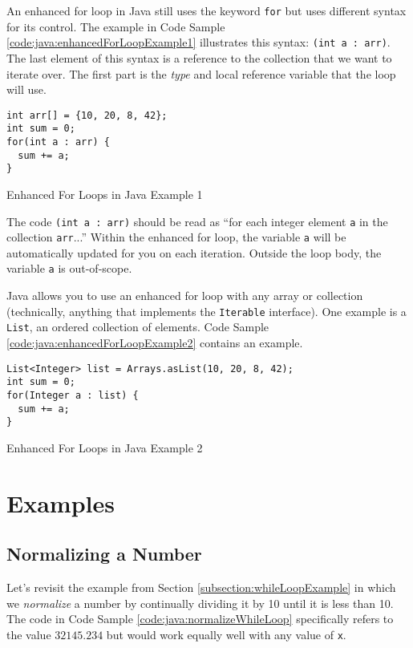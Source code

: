 An enhanced for loop in Java still uses the keyword \texttt{for} 
but uses different syntax for its control.  The example in Code Sample 
\ref{code:java:enhancedForLoopExample1} illustrates this syntax:
\texttt{(int a : arr)}.  The last element of this syntax is
a reference to the collection that we want to iterate over.  The first
part is the \emph{type} and local reference variable that the loop
will use.  

\begin{listing}[H]
\begin{verbatim}
int arr[] = {10, 20, 8, 42};
int sum = 0;
for(int a : arr) {
  sum += a;
}
\end{verbatim}
  \caption{Enhanced For Loops in Java Example 1}
  \label{code:java:enhancedForLoopExample1}
\end{listing}

The code \texttt{(int a : arr)} should be read as ``for each
integer element \texttt{a} in the collection \texttt{arr}...''
Within the enhanced for loop, the variable \texttt{a} will
be automatically updated for you on each iteration.  Outside the
loop body, the variable \texttt{a} is out-of-scope.  

Java allows you to use an enhanced for loop with any array or collection
(technically, anything that implements the \texttt{Iterable} 
interface).  One example is a \texttt{List}, an ordered
collection of elements.  Code Sample \ref{code:java:enhancedForLoopExample2} 
contains an example.

\begin{listing}[H]
\begin{verbatim}
List<Integer> list = Arrays.asList(10, 20, 8, 42);
int sum = 0;
for(Integer a : list) {
  sum += a;
}
\end{verbatim}
  \caption{Enhanced For Loops in Java Example 2}
  \label{code:java:enhancedForLoopExample2}
\end{listing}

\section{Examples}

\subsection{Normalizing a Number}

Let's revisit the example from Section \ref{subsection:whileLoopExample} in which 
we \emph{normalize} a number by continually dividing it by 10 until it is less 
than 10.  The code in Code Sample \ref{code:java:normalizeWhileLoop} specifically
refers to the value $32145.234$ but would work equally well with any value of 
\texttt{x}.

